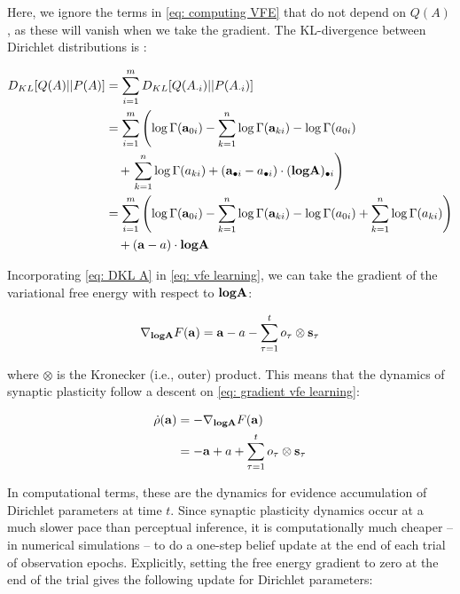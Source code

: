 \documentclass[review,12pt,authoryear]{elsarticle}
\begin{document}
Here, we ignore the terms in \eqref{eq: computing VFE} that do not depend on $Q(A)$, as these will vanish when we take the gradient. The KL-divergence between Dirichlet distributions is \citep{kurtKullbackLeiblerDivergenceTwo2013,pennyKLdivergenceNormalGamma2001}:	 
  	
  	\begin{equation}
  	\label{eq: DKL A}
  	    \begin{split}
  	        D_{KL}[Q(A)||P(A)]&=\sum_{i=1}^m D_{KL}[Q(A_{\cdot i})||P(A_{\cdot i})] \\
  	        &= \sum_{i=1}^m \left( \log \Gamma(\bold a_{0i})- \sum_{k=1}^n \log \Gamma(\bold a_{ki}) -\log \Gamma( a_{0i}) \right.\\
  	        &\quad + \left.\sum_{k=1}^n \log \Gamma( a_{ki}) + (\bold a_{\bullet i}- a_{\bullet i})\cdot (\textbf{log}\bold A)_{\bullet i}\right) \\
  	        &= \sum_{i=1}^m \left( \log \Gamma(\bold a_{0i})- \sum_{k=1}^n \log \Gamma(\bold a_{ki}) -\log \Gamma( a_{0i})+ \sum_{k=1}^n \log \Gamma( a_{ki})\right)\\
  	        &\quad+ (\bold a- a)\cdot \textbf{log}\bold A
  	    \end{split}
  	\end{equation}
  	
Incorporating \eqref{eq: DKL A} in \eqref{eq: vfe learning}, we can take the gradient of the variational free energy with respect to $\textbf{log} \bold A$:

  	\begin{equation}
  	\label{eq: gradient vfe learning}
  	    \nabla_{\textbf{log}\bold A} F(\bold a)= \bold a -a -\sum_{\tau =1}^t o_\tau \otimes \bold s_\tau
  	\end{equation}
  	
where $\otimes$ is the Kronecker (i.e., outer) product. This means that the dynamics of synaptic plasticity follow a descent on \eqref{eq: gradient vfe learning}:

    \begin{equation}
    \begin{split}
         \dot \rho(\bold a) &= -\nabla_{\textbf{log}\bold A} F(\bold a)\\
         &= -\bold a +a +\sum_{\tau =1}^t o_\tau \otimes \bold s_\tau
    \end{split}
    \end{equation}

In computational terms, these are the dynamics for evidence accumulation of Dirichlet parameters at time $t$. Since synaptic plasticity dynamics occur at a much slower pace than perceptual inference, it is computationally much cheaper -- in numerical simulations -- to do a one-step belief update at the end of each trial of observation epochs. Explicitly, setting the free energy gradient to zero at the end of the trial gives the following update for Dirichlet parameters:
\end{document}
